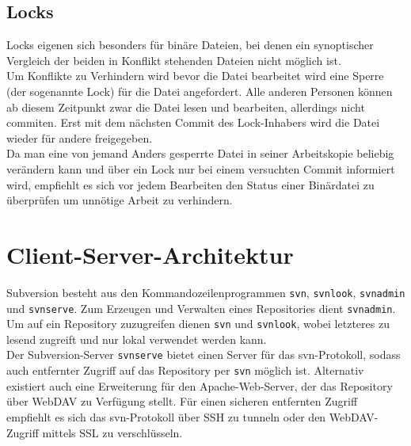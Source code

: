 \subsection{Locks}
Locks eigenen sich besonders für binäre Dateien, bei denen ein synoptischer Vergleich der beiden in Konflikt stehenden Dateien nicht möglich ist.\\
Um Konflikte zu Verhindern wird bevor die Datei bearbeitet wird eine Sperre (der sogenannte Lock) für die Datei angefordert. Alle anderen Personen können ab diesem Zeitpunkt zwar die Datei lesen und bearbeiten, allerdings nicht commiten. Erst mit dem nächsten Commit des Lock-Inhabers wird die Datei wieder für andere freigegeben.\\
Da man eine von jemand Anders gesperrte Datei in seiner Arbeitskopie beliebig verändern kann und über ein Lock nur bei einem versuchten Commit informiert wird, empfiehlt es sich vor jedem Bearbeiten den Status einer Binärdatei zu überprüfen um unnötige Arbeit zu verhindern.

\section{Client-Server-Architektur}
Subversion besteht aus den Kommandozeilenprogrammen \texttt{svn}, \texttt{svnlook}, \texttt{svnadmin} und \texttt{svnserve}. Zum Erzeugen und Verwalten eines Repositories dient \texttt{svnadmin}. Um auf ein Repository zuzugreifen dienen \texttt{svn} und \texttt{svnlook}, wobei letzteres zu lesend zugreift und nur lokal verwendet werden kann.\\
Der Subversion-Server \texttt{svnserve} bietet einen Server für das svn-Protokoll, sodass auch entfernter Zugriff auf das Repository per \texttt{svn} möglich ist. Alternativ existiert auch eine Erweiterung für den Apache-Web-Server, der das Repository über WebDAV zu Verfügung stellt. Für einen sicheren entfernten Zugriff empfiehlt es sich das svn-Protokoll über SSH zu tunneln oder den WebDAV-Zugriff mittels SSL zu verschlüsseln.
